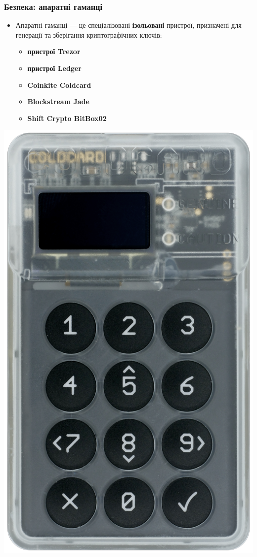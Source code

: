 \documentclass{beamer}
\begin{document}
\begin{frame}[fragile]
  \frametitle{Безпека: апаратні гаманці}
  \begin{minipage}{0.6\textwidth}\raggedright
    \begin{itemize}
    \item Апаратні гаманці — це спеціалізовані \textbf{ізольовані} пристрої,
      призначені для генерації та зберігання криптографічних ключів:
      \begin{itemize}
      \item \textbf{пристрої Trezor}
      \item \textbf{пристрої Ledger}
      \item \textbf{Coinkite Coldcard}
      \item \textbf{Blockstream Jade}
      \item \textbf{Shift Crypto BitBox02}
      \end{itemize}
    \end{itemize}
  \end{minipage}
  \begin{minipage}{0.3\textwidth}\raggedleft
    \includegraphics[width=0.7\linewidth]{coldcard-front}
  \end{minipage}
\end{frame}
\end{document}

